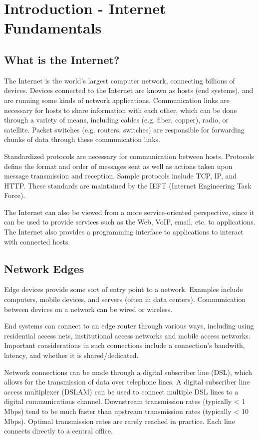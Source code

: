 \documentclass[12pt,titlepage]{article}
\begin{document}
  \section{Introduction - Internet Fundamentals}
    \subsection{What is the Internet?}
      The Internet is the world's largest computer network, connecting billions of devices. Devices
      connected to the Internet are known as hosts (end systems), and are running some kinds of network applications.
      Communication links are necessary for hosts to share information with each other, which can be done through
      a variety of means, including cables (e.g. fiber, copper), radio, or satellite. Packet switches (e.g. routers,
      switches) are responsible for forwarding chunks of data through these communication links.

      Standardized protocols are necessary for communication between hosts. Protocols define the format and order of
      messages sent as well as actions taken upon message transmission and reception. Sample protocols include TCP, IP, and HTTP.
      These standards are maintained by the IEFT (Internet Engineering Task Force).

      The Internet can also be viewed from a more service-oriented perspective, since it can be used to provide
      services such as the Web, VoIP, email, etc. to applications. The Internet also provides a programming interface
      to applications to interact with connected hosts.

    \subsection{Network Edges}
      Edge devices provide some sort of entry point to a network. Examples include computers, mobile devices, and servers
      (often in data centers). Communication between devices on a network can be wired or wireless.

      End systems can connect to an edge router through various ways, including using residential access nets, institutional
      access networks and mobile access networks. Important considerations in such connections include a connection's bandwith,
      latency, and whether it is shared/dedicated.

      Network connections can be made through a digital subscriber line (DSL), which allows for the transmission of data over
      telephone lines. A digital subscriber line access multiplexer (DSLAM) can be used to connect multiple DSL lines to a digital
      communications channel. Downstream transmission rates (typically < 1 Mbps) tend to be much faster than upstream transmission
      rates (typically < 10 Mbps). Optimal transmission rates are rarely reached in practice. Each line connects directly to a
      central office.
\end{document}
